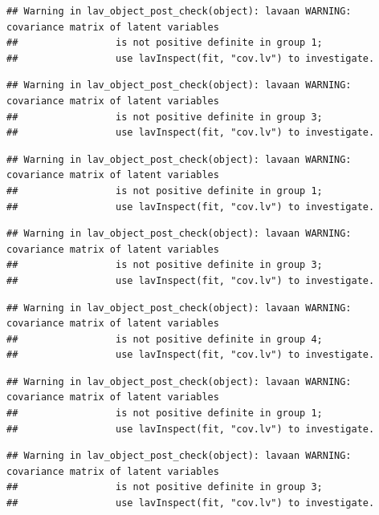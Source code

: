 \documentclass[
  english,
  man]{apa6}
\begin{document}
\begin{verbatim}
## Warning in lav_object_post_check(object): lavaan WARNING: covariance matrix of latent variables
##                 is not positive definite in group 1;
##                 use lavInspect(fit, "cov.lv") to investigate.
\end{verbatim}

\begin{verbatim}
## Warning in lav_object_post_check(object): lavaan WARNING: covariance matrix of latent variables
##                 is not positive definite in group 3;
##                 use lavInspect(fit, "cov.lv") to investigate.
\end{verbatim}

\begin{verbatim}
## Warning in lav_object_post_check(object): lavaan WARNING: covariance matrix of latent variables
##                 is not positive definite in group 1;
##                 use lavInspect(fit, "cov.lv") to investigate.
\end{verbatim}

\begin{verbatim}
## Warning in lav_object_post_check(object): lavaan WARNING: covariance matrix of latent variables
##                 is not positive definite in group 3;
##                 use lavInspect(fit, "cov.lv") to investigate.
\end{verbatim}

\begin{verbatim}
## Warning in lav_object_post_check(object): lavaan WARNING: covariance matrix of latent variables
##                 is not positive definite in group 4;
##                 use lavInspect(fit, "cov.lv") to investigate.
\end{verbatim}

\begin{verbatim}
## Warning in lav_object_post_check(object): lavaan WARNING: covariance matrix of latent variables
##                 is not positive definite in group 1;
##                 use lavInspect(fit, "cov.lv") to investigate.
\end{verbatim}

\begin{verbatim}
## Warning in lav_object_post_check(object): lavaan WARNING: covariance matrix of latent variables
##                 is not positive definite in group 3;
##                 use lavInspect(fit, "cov.lv") to investigate.
\end{verbatim}
\end{document}
